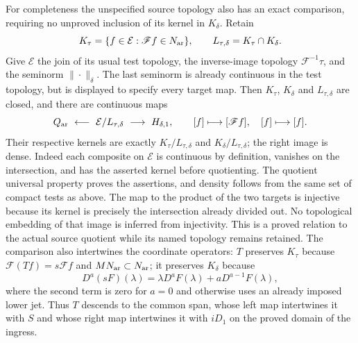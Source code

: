 For completeness the unspecified source topology also has an exact
comparison, requiring no unproved inclusion of its kernel in
$K_\delta$. Retain
\[
 K_\tau=\{f\in\mathcal E:\mathscr Ff\in N_{\rm ar}\},
 \qquad L_{\tau,\delta}=K_\tau\cap K_\delta.
\]
Give $\mathcal E$ the join of its usual test topology, the
inverse-image topology $\mathscr F^{-1}\tau$, and the seminorm
$\|\cdot\|_\delta$. The last seminorm is already continuous in
the test topology, but is displayed to specify every target map.
Then $K_\tau$, $K_\delta$ and $L_{\tau,\delta}$ are closed, and
there are continuous maps
\begin{equation}\label{csq:eq-sobolev-source-span}
 Q_{\rm ar}\ \longleftarrow\
 \mathcal E/L_{\tau,\delta}
 \ \longrightarrow\ H_{\delta,1},
 \qquad
 [f]\longmapsto[\mathscr Ff],\quad [f]\longmapsto[f].
\end{equation}
Their respective kernels are exactly
$K_\tau/L_{\tau,\delta}$ and $K_\delta/L_{\tau,\delta}$;
the right image is dense. Indeed each composite on $\mathcal E$
is continuous by definition, vanishes on the intersection, and
has the asserted kernel before quotienting. The quotient universal
property proves the assertions, and density follows from the same
set of compact tests as above. The map to the product of the two
targets is injective because its kernel is precisely the
intersection already divided out. No topological embedding of that
image is inferred from injectivity. This is a proved relation to
the actual source quotient while its named topology remains retained.
The comparison also intertwines the coordinate operators: $T$
preserves $K_\tau$ because $\mathscr F(Tf)=s\mathscr Ff$ and
$MN_{\rm ar}\subset N_{\rm ar}$; it preserves $K_\delta$ because
\[
 D^a(sF)(\lambda)=\lambda D^aF(\lambda)
                              +aD^{a-1}F(\lambda),
\]
where the second term is zero for $a=0$ and otherwise uses an
already imposed lower jet. Thus $T$ descends to the common span,
whose left map intertwines it with $S$ and whose right map
intertwines it with $iD_1$ on the proved domain of the ingress.

